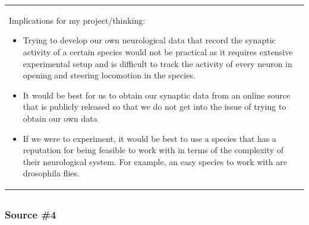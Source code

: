 \begin{longtable}[]{@{}
  >{\raggedright\arraybackslash}p{}@{}}
Implications for my project/thinking:

\begin{itemize}
\item
  Trying to develop our own neurological data that record the synaptic
  activity of a certain species would not be practical as it requires
  extensive experimental setup and is difficult to track the activity of
  every neuron in opening and steering locomotion in the species.
\item
  It would be best for us to obtain our synaptic data from an online
  source that is publicly released so that we do not get into the issue
  of trying to obtain our own data
\item
  If we were to experiment, it would be best to use a species that has a
  reputation for being feasible to work with in terms of the complexity
  of their neurological system. For example, an easy species to work
  with are drosophila flies.
\end{itemize}

\midrule\noalign{}
\endhead
\bottomrule\noalign{}
\endlastfoot
\end{longtable}

\subsection{\texorpdfstring{\hfill\break
}{ }}\label{section-3}

\subsubsection{\texorpdfstring{\textbf{Source
\#4}}{Source \#4}}\label{source-4}

